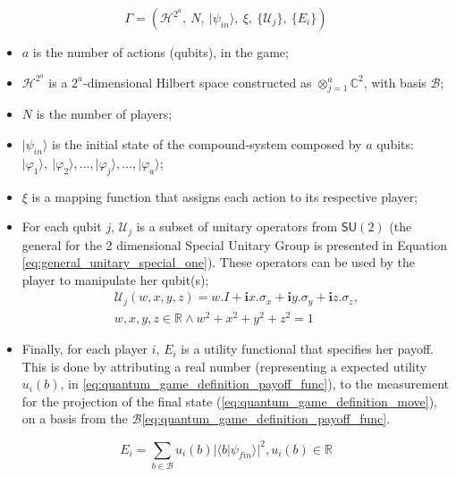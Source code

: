 \begin{equation}
\Gamma=(\mathcal{H}^{2^{a}},\: N,\:\vert\psi_{in}\rangle,\:\xi,\:\{\mathcal{U}_{j}\},\:\{E_{i}\})\label{eq:quantum_game_six_tuple}
\end{equation}

\begin{itemize}
\item $a$ is the number of actions (qubits), in the game; 
\item $\mathcal{H}^{2^{a}}$ is a $2^{a}$-dimensional Hilbert space constructed
as $\otimes_{j=1}^{a}\mathbb{C}^{2}$, with basis $\mathcal{B}$;
\item $N$ is the number of players;
\item $\vert\psi_{in}\rangle$ is the initial state of the compound-system
composed by $a$ qubits: $\vert\varphi_{1}\rangle,\:\vert\varphi_{2}\rangle, ..., \vert\varphi_{j}\rangle, ..., \vert\varphi_{a}\rangle$;
\item $\xi$ is a mapping function that assigns each action to its respective player;
\item For each qubit $j$, $\mathcal{U}_{j}$ is a subset of unitary operators from $\mathsf{SU}(2)$ (the general for the 2 dimensional Special Unitary Group is presented in Equation \eqref{eq:general_unitary_special_one}).
These operators can be used by the player to manipulate her qubit(s);
\begin{equation}
\begin{split}
\mathcal{U}_{j}(w,x,y,z)=w.I + \mathbf{i}x.\sigma_{x} + \mathbf{i}y.\sigma_{y} + \mathbf{i}z.\sigma_{z}, \\  w,x,y,z \in \mathbb{R} \wedge  
w^2 + x^2 + y^2 + z^2 =1 
\end{split}
\label{eq:general_unitary_special_one}
\end{equation}
\item Finally, for each player $i$, $E_{i}$ is a utility functional that
specifies her payoff. This is done by attributing a real number (representing a expected utility $ u_{i}(b)$, in \eqref{eq:quantum_game_definition_payoff_func}), to the measurement for the projection of the final state (\eqref{eq:quantum_game_definition_move}), on a basis from the $\mathcal{B}$\eqref{eq:quantum_game_definition_payoff_func}.\end{itemize}



\begin{equation}
E_{i}=\sum_{b \in \mathcal{B}} u_{i}(b)\vert \langle b\vert \psi_{fin}\rangle\vert^{2}, u_{i}(b) \in \mathbb{R}
\label{eq:quantum_game_definition_payoff_func}
\end{equation}

